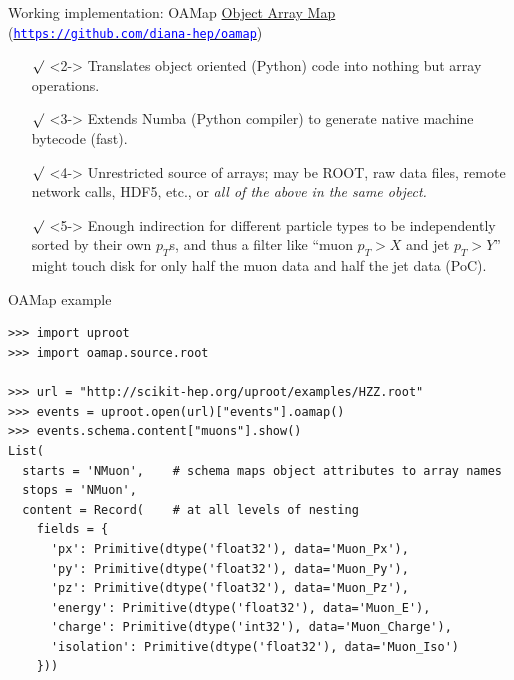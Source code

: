\documentclass[aspectratio=169]{beamer}
\begin{document}
\begin{frame}{Working implementation: OAMap}
\vspace{0.5 cm}
\underline{Object Array Map} (\href{https://github.com/diana-hep/oamap}{\textcolor{blue}{\tt https://github.com/diana-hep/oamap}})

\vspace{0.25 cm}
\begin{itemize}\setlength{\itemsep}{0.25 cm}
\item[$\surd$]<2-> Translates object oriented (Python) code into nothing but array operations.
\item[$\surd$]<3-> Extends Numba (Python compiler) to generate native machine bytecode (fast).
\item[$\surd$]<4-> Unrestricted source of arrays; may be ROOT, raw data files, remote network calls, HDF5, etc., or {\it all of the above in the same object.}
\item[$\surd$]<5-> Enough indirection for different particle types to be independently sorted by their own $p_T$s, and thus a filter like ``muon $p_T > X$ and jet $p_T > Y$'' might touch disk for only half the muon data and half the jet data (PoC).
\end{itemize}
\end{frame}

\begin{frame}[fragile]{OAMap example}
\small
\begin{verbatim}
>>> import uproot
>>> import oamap.source.root

>>> url = "http://scikit-hep.org/uproot/examples/HZZ.root"
>>> events = uproot.open(url)["events"].oamap()
>>> events.schema.content["muons"].show()
List(
  starts = 'NMuon',    # schema maps object attributes to array names
  stops = 'NMuon',
  content = Record(    # at all levels of nesting
    fields = {
      'px': Primitive(dtype('float32'), data='Muon_Px'),
      'py': Primitive(dtype('float32'), data='Muon_Py'),
      'pz': Primitive(dtype('float32'), data='Muon_Pz'),
      'energy': Primitive(dtype('float32'), data='Muon_E'),
      'charge': Primitive(dtype('int32'), data='Muon_Charge'),
      'isolation': Primitive(dtype('float32'), data='Muon_Iso')
    }))
\end{verbatim}
\end{frame}
\end{document}
